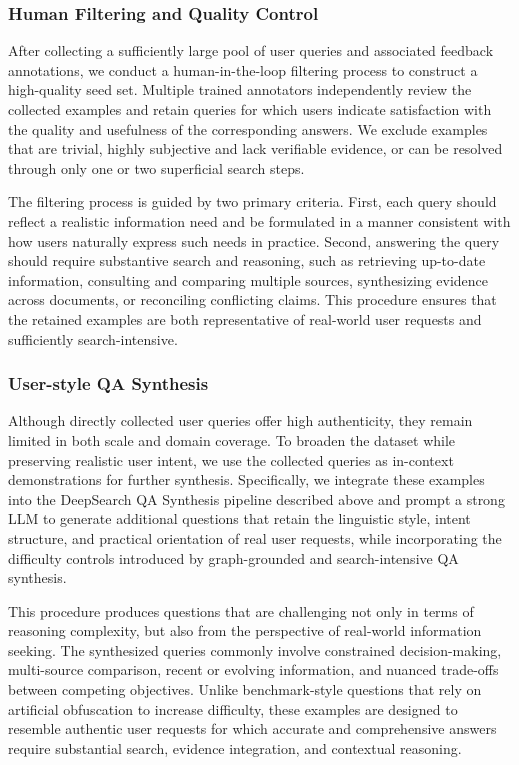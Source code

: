 \documentclass{huawei}
\begin{document}
\subsubsection{Human Filtering and Quality Control}
After collecting a sufficiently large pool of user queries and associated feedback annotations, we conduct a human-in-the-loop filtering process to construct a high-quality seed set. Multiple trained annotators independently review the collected examples and retain queries for which users indicate satisfaction with the quality and usefulness of the corresponding answers. We exclude examples that are trivial, highly subjective and lack verifiable evidence, or can be resolved through only one or two superficial search steps.



The filtering process is guided by two primary criteria. First, each query should reflect a realistic information need and be formulated in a manner consistent with how users naturally express such needs in practice. Second, answering the query should require substantive search and reasoning, such as retrieving up-to-date information, consulting and comparing multiple sources, synthesizing evidence across documents, or reconciling conflicting claims. This procedure ensures that the retained examples are both representative of real-world user requests and sufficiently search-intensive.





\subsubsection{User-style QA Synthesis}
Although directly collected user queries offer high authenticity, they remain limited in both scale and domain coverage. To broaden the dataset while preserving realistic user intent, we use the collected queries as in-context demonstrations for further synthesis. Specifically, we integrate these examples into the DeepSearch QA Synthesis pipeline described above and prompt a strong LLM to generate additional questions that retain the linguistic style, intent structure, and practical orientation of real user requests, while incorporating the difficulty controls introduced by graph-grounded and search-intensive QA synthesis.



This procedure produces questions that are challenging not only in terms of reasoning complexity, but also from the perspective of real-world information seeking. The synthesized queries commonly involve constrained decision-making, multi-source comparison, recent or evolving information, and nuanced trade-offs between competing objectives. Unlike benchmark-style questions that rely on artificial obfuscation to increase difficulty, these examples are designed to resemble authentic user requests for which accurate and comprehensive answers require substantial search, evidence integration, and contextual reasoning.
\end{document}
